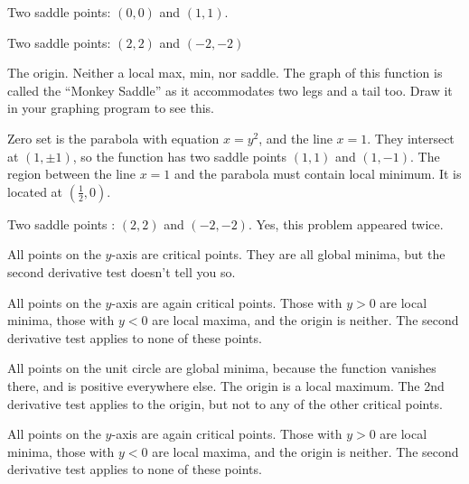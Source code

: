 \item[{\bfseries(V6.1i)}]

Two saddle points:  $(0,0)$ and $(1,1)$.
\bigskip

\item[{\bfseries(V6.1j)}]
 Two saddle points:  $(2,2)$ and $(-2,-2)$
\bigskip

\item[{\bfseries(V6.1l)}]
 The origin. Neither a local max, min, nor saddle.
The graph of this function is called the ``Monkey Saddle'' as
it accommodates two legs and a tail too.  Draw it in your graphing
program to see this.
\bigskip

\item[{\bfseries(V6.1m)}]

Zero set is the parabola with equation $x=y^2$, and the line
$x=1$.  They intersect at $(1, \pm1)$, so the function has two saddle
points $(1,1)$ and $(1,-1)$.  The region between the line $x=1$ and
the parabola must contain  local minimum.  It is located at
$(\frac12, 0)$.
\bigskip

\item[{\bfseries(V6.1n)}]
 Two saddle points : $(2,2)$ and $(-2,-2)$.
Yes, this problem appeared twice.
\bigskip

\item[{\bfseries(V6.1o)}]
  All points on the $y$-axis are critical points.  They are all
global minima, but the second derivative test doesn't tell you so.
\bigskip

\item[{\bfseries(V6.1p)}]

All points on the $y$-axis are again critical points.  Those with
$y>0$ are local minima, those with $y<0$ are local maxima, and the
origin is neither.  The second derivative test applies to none of
these points.
\bigskip

\item[{\bfseries(V6.1q)}]
  All points on the unit circle are global minima, because the
function vanishes there, and is positive everywhere else.  The origin
is a local maximum.  The 2nd derivative test applies to the origin,
but not to any of the other critical points.
\bigskip

\item[{\bfseries(V6.1r)}]

All points on the $y$-axis are again critical points.  Those with
$y>0$ are local minima, those with $y<0$ are local maxima, and the
origin is neither.  The second derivative test applies to none of
these points.
\bigskip

